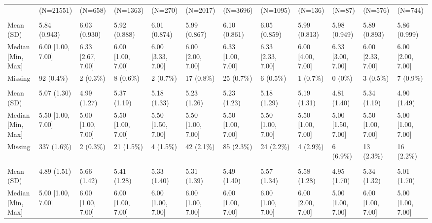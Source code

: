 \documentclass[
  single column]{article}
\begin{document}
\begin{landscape}
\begin{longtable}[t]{llllllllllll}
\endfoot
\bottomrule
\endlastfoot
 & (N=21551) & (N=658) & (N=1363) & (N=270) & (N=2017) & (N=3696) & (N=1095) & (N=136) & (N=87) & (N=576) & (N=744)\\
\addlinespace[0.3em]
\multicolumn{12}{l}{\textbf{Gratitude}}\\
\hspace{1em}Mean (SD) & 5.84 (0.943) & 6.03 (0.930) & 5.92 (0.888) & 6.01 (0.874) & 5.99 (0.867) & 6.10 (0.861) & 6.05 (0.859) & 5.99 (0.813) & 5.98 (0.949) & 5.89 (0.893) & 5.86 (0.999)\\
\hspace{1em}Median [Min, Max] & 6.00 [1.00, 7.00] & 6.33 [2.67, 7.00] & 6.00 [1.00, 7.00] & 6.00 [3.33, 7.00] & 6.00 [2.00, 7.00] & 6.33 [1.00, 7.00] & 6.33 [2.33, 7.00] & 6.00 [4.00, 7.00] & 6.33 [3.00, 7.00] & 6.00 [2.33, 7.00] & 6.00 [2.00, 7.00]\\
\hspace{1em}Missing & 92 (0.4\%) & 2 (0.3\%) & 8 (0.6\%) & 2 (0.7\%) & 17 (0.8\%) & 25 (0.7\%) & 6 (0.5\%) & 1 (0.7\%) & 0 (0\%) & 3 (0.5\%) & 7 (0.9\%)\\
\addlinespace[0.3em]
\multicolumn{12}{l}{\textbf{Life Satisfaction}}\\
\hspace{1em}Mean (SD) & 5.07 (1.30) & 4.99 (1.27) & 5.37 (1.19) & 5.18 (1.33) & 5.23 (1.26) & 5.23 (1.23) & 5.18 (1.29) & 5.19 (1.31) & 4.81 (1.40) & 5.34 (1.19) & 4.90 (1.49)\\
\hspace{1em}Median [Min, Max] & 5.50 [1.00, 7.00] & 5.00 [1.00, 7.00] & 5.50 [1.00, 7.00] & 5.50 [1.50, 7.00] & 5.50 [1.00, 7.00] & 5.50 [1.00, 7.00] & 5.50 [1.00, 7.00] & 5.50 [1.00, 7.00] & 5.00 [1.50, 7.00] & 5.50 [1.00, 7.00] & 5.00 [1.00, 7.00]\\
\hspace{1em}Missing & 337 (1.6\%) & 2 (0.3\%) & 21 (1.5\%) & 4 (1.5\%) & 42 (2.1\%) & 85 (2.3\%) & 24 (2.2\%) & 4 (2.9\%) & 6 (6.9\%) & 13 (2.3\%) & 16 (2.2\%)\\
\addlinespace[0.3em]
\multicolumn{12}{l}{\textbf{Meaning: Purpose}}\\
\hspace{1em}Mean (SD) & 4.89 (1.51) & 5.66 (1.42) & 5.41 (1.28) & 5.33 (1.40) & 5.31 (1.39) & 5.49 (1.40) & 5.57 (1.34) & 5.58 (1.28) & 4.95 (1.70) & 5.34 (1.32) & 5.01 (1.70)\\
\hspace{1em}Median [Min, Max] & 5.00 [1.00, 7.00] & 6.00 [1.00, 7.00] & 6.00 [1.00, 7.00] & 6.00 [1.00, 7.00] & 6.00 [1.00, 7.00] & 6.00 [1.00, 7.00] & 6.00 [1.00, 7.00] & 6.00 [2.00, 7.00] & 5.00 [1.00, 7.00] & 6.00 [1.00, 7.00] & 5.00 [1.00, 7.00]\\

\end{longtable}
\end{landscape}
\end{document}
